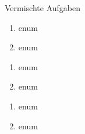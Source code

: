 


\begin{inhalt}
  \item Vermischte Aufgaben
\end{inhalt}

\begin{enumerate}
	\item enum
	\item	enum
\end{enumerate}

\begin{enumerate}
	\item enum
	\item	enum
\end{enumerate}

\begin{enumerate}
	\item enum
	\item	enum
\end{enumerate}


